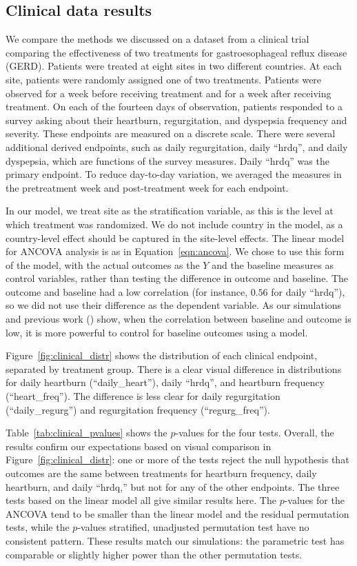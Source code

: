 \documentclass[11pt]{article}
\begin{document}
\subsection{Clinical data results}
We compare the methods we discussed on a dataset from a clinical trial comparing the effectiveness of two treatments for gastroesophageal reflux disease (GERD).
Patients were treated at eight sites in two different countries.
At each site, patients were randomly assigned one of two treatments.
Patients were observed for a week before receiving treatment and for a week after receiving treatment.
On each of the fourteen days of observation, patients responded to a survey asking about their heartburn, regurgitation, and dyspepsia frequency and severity.
These endpoints are measured on a discrete scale.
There were several additional derived endpoints, such as daily regurgitation, daily ``hrdq'', and daily dyspepsia, which are functions of the survey measures.
Daily ``hrdq'' was the primary endpoint.
To reduce day-to-day variation, we averaged the measures in the pretreatment week and post-treatment week for each endpoint.

In our model, we treat site as the stratification variable, as this is the level at which treatment was randomized.
We do not include country in the model, as a country-level effect should be captured in the site-level effects.
The linear model for ANCOVA analysis is as in Equation~\ref{eqn:ancova}.
We chose to use this form of the model, with the actual outcomes as the $Y$ and the baseline measures as control variables, rather than testing the difference in outcome and baseline. 
The outcome and baseline had a low correlation (for instance, $0.56$ for daily ``hrdq''), so we did not use their difference as the dependent variable. 
As our simulations and previous work (\cite{frison_repeated_1992}) show, when the correlation between baseline and outcome is low, it is more powerful to control for baseline outcomes using a model.

Figure~\ref{fig:clinical_distr} shows the distribution of each clinical endpoint, separated by treatment group.
There is a clear visual difference in distributions for daily heartburn (``daily\_heart''), daily ``hrdq'', and heartburn frequency (``heart\_freq'').
The difference is less clear for daily regurgitation (``daily\_regurg'') and regurgitation frequency (``regurg\_freq'').

Table~\ref{tab:clinical_pvalues} shows the $p$-values for the four tests.
Overall, the results confirm our expectations based on visual comparison in Figure~\ref{fig:clinical_distr}:
one or more of the tests reject the null hypothesis that outcomes are the same between treatments for heartburn frequency, daily heartburn, and daily ``hrdq,''
but not for any of the other endpoints.
The three tests based on the linear model all give similar results here.
The $p$-values for the ANCOVA tend to be smaller than the linear model and the residual permutation tests, while the $p$-values stratified, unadjusted permutation test have no consistent pattern.
These results match our simulations: the parametric test has comparable or slightly higher power than the other permutation tests.
\end{document}
